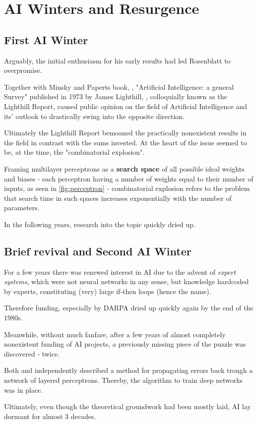 \chapter{AI Winters and Resurgence}

\section{First AI Winter}

Arguably, the initial enthusiasm for his early results had led Rosenblatt to overpromise. 

Together with Minsky and Paperts book, \cite{minsky}, "Artificial Intelligence: a general Survey" published in 1973 by James Lighthill, \cite{lighthill1973artificial}, colloquially known as the Lighthill Report, caused public opinion on the field of Artificial Intelligence and its' outlook to drastically swing into the opposite direction.

Ultimately the Lighthill Report bemoaned the practically nonexistent results in the field in contrast with the sums invested. At the heart of the issue seemed to be, at the time, the "combinatorial explosion".

Framing multilayer perceptrons as a \textbf{search space} of all possible ideal weights and biases - each perceptron having a number of weights equal to their number of inputs, as seen in \ref{fig:perceptron} - combinatorial explosion refers to the problem that search time in such spaces increases exponentially with the number of parameters. 

In the following years, research into the topic quickly dried up.

\section{Brief revival and Second AI Winter}

For a few years there was renewed interest in \ac{AI} due to the advent of \textit{expert systems}, which were not neural networks in any sense, but knowledge hardcoded by experts, constituting (very) large if-then loops (hence the name). 

Therefore funding, especially by DARPA dried up quickly again by the end of the 1980s.

Meanwhile, without much fanfare, after a few years of almost completely nonexistent funding of AI projects, a previously missing piece of the puzzle was discovered - twice.

Both \cite{backprop} and \cite{backprop_werbos} independently described a method for propagating errors back trough a network of layered perceptrons. Thereby, the algorithm to train deep networks was in place.

Ultimately, even though the theoretical groundwork had been mostly laid, \ac{AI} lay dormant for almost 3 decades.
